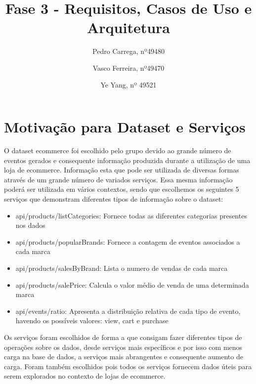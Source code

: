 \documentclass[11pt,a4paper]{article}
\begin{document}
\title{Fase 3 - Requisitos, Casos de Uso e Arquitetura}
\author{Pedro Carrega, nº49480 \and
Vasco Ferreira, nº49470 \and Ye Yang, nº 49521
}


\maketitle

\tableofcontents

\section{Motivação para Dataset e Serviços}

O dataset ecommerce foi escolhido pelo grupo devido ao grande número de eventos gerados e consequente informação produzida durante a utilização de uma loja de ecommerce. Informação esta que pode ser utilizada de diversas formas através de um grande número de variados serviços. Essa mesma informação poderá ser utilizada em vários contextos, sendo que escolhemos os seguintes 5 serviços que demonstram diferentes tipos de informação sobre o dataset:

\begin{itemize}
  \item api/products/listCategories: Fornece todas as diferentes categorias presentes nos dados
  \item api/products/popularBrands: Fornece a contagem de eventos associados a cada marca
  \item api/products/salesByBrand: Lista o numero de vendas de cada marca
  \item api/products/salePrice: Calcula o valor médio de venda de uma determinada marca
  \item api/events/ratio: Apresenta a distribuição relativa de cada tipo de evento, havendo os possíveis valores: view, cart e purchase
\end{itemize}

Os serviços foram escolhidos de forma a que consigam fazer diferentes tipos de operações sobre os dados, desde serviços mais específicos e por isso com menos carga na base de dados, a serviços mais abrangentes e consequente aumento de carga. Foram também escolhidos pois todos os serviços fornecem dados úteis para serem explorados no contexto de lojas de ecommerce.
\end{document}
